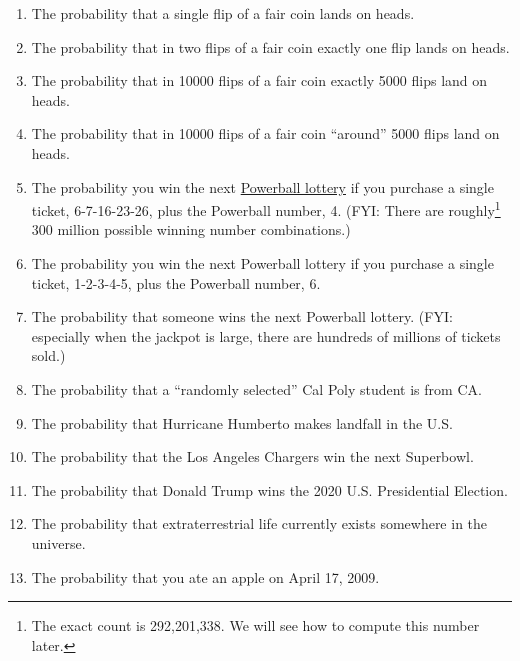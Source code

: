 \documentclass[
]{book}
\providecommand{\tightlist}{%
  \setlength{\itemsep}{0pt}\setlength{\parskip}{0pt}}
\theoremstyle{definition}
\theoremstyle{definition}
\theoremstyle{definition}
\theoremstyle{remark}
\begin{document}
\begin{enumerate}
\def\labelenumi{\arabic{enumi}.}
\tightlist
\item
  The probability that a single flip of a fair coin lands on heads.
\item
  The probability that in two flips of a fair coin exactly one flip lands on heads.
\item
  The probability that in 10000 flips of a fair coin exactly 5000 flips land on heads.
\item
  The probability that in 10000 flips of a fair coin ``around'' 5000 flips land on heads.
\item
  The probability you win the next \href{https://www.powerball.com/}{Powerball lottery} if you purchase a single ticket, 6-7-16-23-26, plus the Powerball number, 4. (FYI: There are roughly\footnote{The exact count is 292,201,338. We will see how to compute this number later.} 300 million possible winning number combinations.)
\item
  The probability you win the next Powerball lottery if you purchase a single ticket, 1-2-3-4-5, plus the Powerball number, 6.
\item
  The probability that someone wins the next Powerball lottery. (FYI: especially when the jackpot is large, there are hundreds of millions of tickets sold.)
\item
  The probability that a ``randomly selected'' Cal Poly student is from CA.\\
\item
  The probability that Hurricane Humberto makes landfall in the U.S.
\item
  The probability that the Los Angeles Chargers win the next Superbowl.
\item
  The probability that Donald Trump wins the 2020 U.S. Presidential Election.
\item
  The probability that extraterrestrial life currently exists somewhere in the universe.
\item
  The probability that you ate an apple on April 17, 2009.
\end{enumerate}
\end{document}
